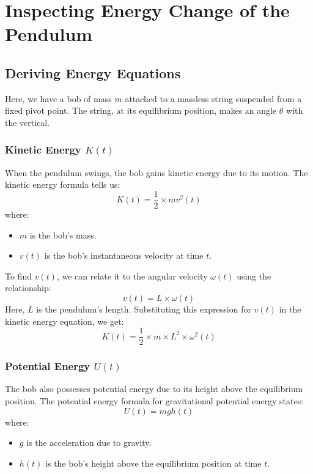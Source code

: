 \section{Inspecting Energy Change of the Pendulum}

\subsection{Deriving Energy Equations}

Here, we have a bob of mass $m$ attached to a massless string suspended from a fixed pivot point. The string, at its equilibrium position, makes an angle $\theta$ with the vertical.

\newpage
\thispagestyle{plain}

\subsubsection{Kinetic Energy $K(t)$}

When the pendulum swings, the bob gains kinetic energy due to its motion. The kinetic energy formula tells us: 
	\[K(t) = \frac{1}{2} \times mv^{2}(t)\] 
where:
\begin{itemize}
	\item $m$ is the bob's mass.
	\item $v(t)$ is the bob's instantaneous velocity at time $t$.
\end{itemize}

\noindent To find $v(t)$, we can relate it to the angular velocity $\omega (t)$ using the relationship: 
	\[v(t) = L \times \omega (t)\] 
Here, $L$ is the pendulum's length. Substituting this expression for $v(t)$ in the kinetic energy equation, we get: 
	\[K(t) = \frac{1}{2} \times m \times L^{2} \times \omega^{2}(t)\]

\subsubsection{Potential Energy $U(t)$}

The bob also possesses potential energy due to its height above the equilibrium position. The potential energy formula for gravitational potential energy states: 
	\[U(t) = mgh(t)\] 
where:
\begin{itemize}
	\item $g$ is the acceleration due to gravity.
	\item $h(t)$ is the bob's height above the equilibrium position at time $t$.
\end{itemize}

